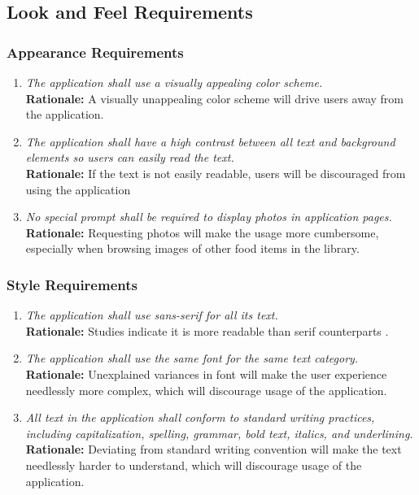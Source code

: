 \documentclass[]{article}
\begin{document}
\subsection{Look and Feel Requirements}
\label{sub:look_and_feel_requirements}

\subsubsection{Appearance Requirements}
\label{ssub:appearance_requirements}
\begin{enumerate}[{LF-A}1. ]
    \item \textit{The application shall use a visually appealing color scheme.} \\ \textbf{Rationale:} A visually unappealing color scheme will drive users away from the application.
    \item \textit{The application shall have a high contrast between all text and background elements so users can easily read the text.} \\
    \textbf{Rationale:} If the text is not easily readable, users will be discouraged from using the application
    \item \textit{No special prompt shall be required to display photos in application pages.} \\ \textbf{Rationale:} Requesting photos will make the usage more cumbersome, especially when browsing images of other food items in the library.
\end{enumerate}

\subsubsection{Style Requirements}
\label{ssub:style_requirements}
\begin{enumerate}[{LF-S}1. ]
    \item \textit{The application shall use sans-serif for all its text.} \\ \textbf{Rationale:} Studies indicate it is more readable than serif counterparts \cite{Adobe}.
    \item \textit{The application shall use the same font for the same text category.} \\ \textbf{Rationale:} Unexplained variances in font will make the user experience needlessly more complex, which will discourage usage of the application.
    \item \textit{All text in the application shall conform to standard writing practices, including capitalization, spelling, grammar, bold text, italics, and underlining.} \\ \textbf{Rationale:} Deviating from standard writing convention will make the text needlessly harder to understand, which will discourage usage of the application.
\end{enumerate}
\end{document}
